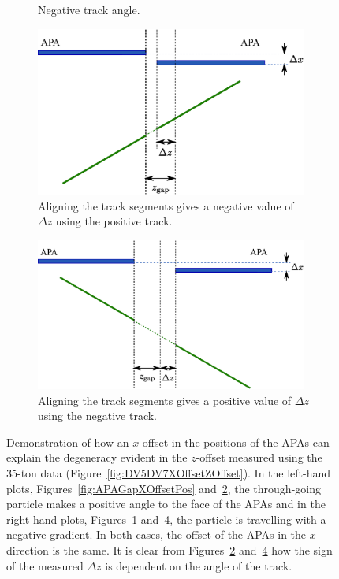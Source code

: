 \begin{figure}
\begin{subfigure}[t]{0.48\linewidth}
    \caption{Negative track angle.}
    \label{fig:APAGapXOffsetNeg}
  \end{subfigure}
  \vfill
  \begin{subfigure}[t]{0.48\linewidth}
    \centering
    \includegraphics[width=0.98\textwidth]{apa_gap_xoffset_pos_fix.eps}
    \caption{Aligning the track segments gives a negative value of $\Delta z$ using the positive track.}
    \label{fig:APAGapXOffsetPosFix}
  \end{subfigure}
  \hfill
  \begin{subfigure}[t]{0.48\linewidth}
    \centering
    \includegraphics[width=0.98\textwidth]{apa_gap_xoffset_neg_fix.eps}
    \caption{Aligning the track segments gives a positive value of $\Delta z$ using the negative track.}
    \label{fig:APAGapXOffsetNegFix}
  \end{subfigure}
  \caption[Demonstration of how an $x$-offset in the positions of the APAs can explain the degeneracy evident in the $z$-offset measured using the 35-ton data.]{Demonstration of how an $x$-offset in the positions of the APAs can explain the degeneracy evident in the $z$-offset measured using the 35-ton data (Figure~\ref{fig:DV5DV7XOffsetZOffset}).  In the left-hand plots, Figures~\ref{fig:APAGapXOffsetPos} and~\ref{fig:APAGapXOffsetPosFix}, the through-going particle makes a positive angle to the face of the APAs and in the right-hand plots, Figures~\ref{fig:APAGapXOffsetNeg} and~\ref{fig:APAGapXOffsetNegFix}, the particle is travelling with a negative gradient.  In both cases, the offset of the APAs in the $x$-direction is the same.  It is clear from Figures~\ref{fig:APAGapXOffsetPosFix} and~\ref{fig:APAGapXOffsetNegFix} how the sign of the measured $\Delta z$ is dependent on the angle of the track.}

\end{figure}

